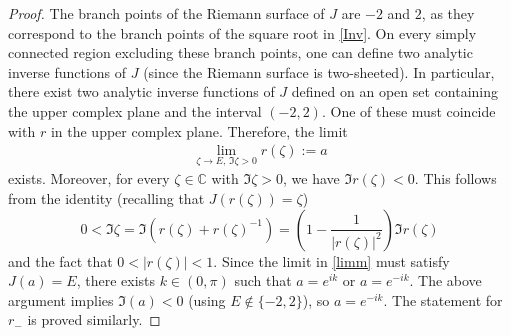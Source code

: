\documentclass[12pt,oneside,onecolumn,open]{article}
\newtheorem{lema}[teo]{Lemma}
\begin{document}
\begin{proof}
The branch points of the Riemann surface of \( J \) are \( -2 \) and \( 2 \), as they correspond to the branch points of the square root in \eqref{Inv}. On every simply connected region excluding these branch points, one can define two analytic inverse functions of \( J \) (since the Riemann surface is two-sheeted). In particular, there exist two analytic inverse functions of \( J \) defined on an open set containing the upper complex plane and the interval \( (-2, 2) \). One of these must coincide with \( r \) in the upper complex plane. Therefore, the limit  
\begin{align}\label{limm}  
\lim_{\zeta \to E, \, \Im \zeta > 0} r(\zeta) := a  
\end{align}  
exists. Moreover, for every \( \zeta \in \mathbb{C} \) with \( \Im \zeta > 0 \), we have \( \Im r(\zeta) < 0 \). This follows from the identity (recalling that \( J(r(\zeta)) = \zeta \))  
\[  
0 < \Im \zeta = \Im \left( r(\zeta) + r(\zeta)^{-1} \right) = \left( 1 - \frac{1}{|r(\zeta)|^2} \right) \Im r(\zeta)  
\]  
and the fact that \( 0 < |r(\zeta)| < 1 \). Since the limit in \eqref{limm} must satisfy \( J(a) = E \), there exists \( k \in (0, \pi) \) such that \( a = e^{ik} \) or \( a = e^{-ik} \). The above argument implies \( \Im(a) < 0 \) (using \( E \notin \{-2, 2\} \)), so \( a = e^{-ik} \). The statement for \( r_- \) is proved similarly.


    
\end{proof}









    

    
\end{document}
